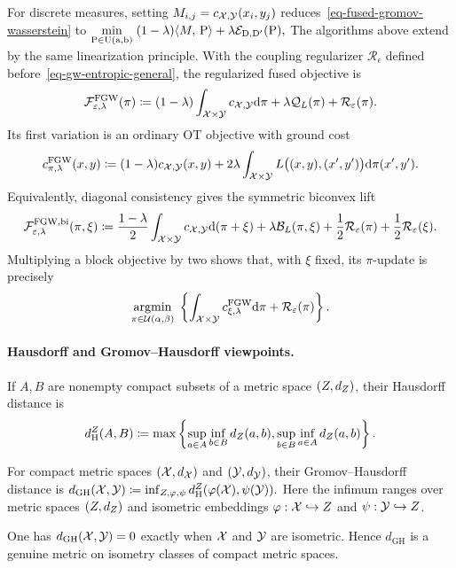 For discrete measures, setting $M_{i,j}=c_{\mathcal{X},\mathcal{Y}}(x_i,y_j)$ reduces~\eqref{eq-fused-gromov-wasserstein} to
\(\underset{\mathrm{P}\in\mathrm{U}(\mathrm{a},\mathrm{b})}{\min}\; (1-\lambda)\langle M,\,\mathrm{P}\rangle + \lambda\mathcal{E}_{\mathrm{D},\mathrm{D}'}(\mathrm{P}),\)
The algorithms above extend by the same linearization principle. With the coupling regularizer $\mathcal R_\epsilon$ defined before~\eqref{eq-gw-entropic-general}, the regularized fused objective is
\[
\mathcal F_{\varepsilon,\lambda}^{\mathrm{FGW}}(\pi)
\coloneqq
(1-\lambda)\int_{\mathcal{X}\times\mathcal{Y}}c_{\mathcal{X},\mathcal{Y}}\mathrm{d}\pi
+
\lambda\mathcal Q_L(\pi)
+
\mathcal R_\varepsilon(\pi).
\]
Its first variation is an ordinary OT objective with ground cost
\begin{equation}\label{eq-fused-gw-linearized-cost}
c_{\pi,\lambda}^{\mathrm{FGW}}(x,y)
\coloneqq
(1-\lambda)c_{\mathcal{X},\mathcal{Y}}(x,y)
+
2\lambda
\int_{\mathcal{X}\times\mathcal{Y}}
L\bigl((x,y),(x',y')\bigr)\mathrm{d}\pi(x',y').
\end{equation}
Equivalently, diagonal consistency gives the symmetric biconvex lift
\[
\mathcal F_{\varepsilon,\lambda}^{\mathrm{FGW,bi}}(\pi,\xi)
\coloneqq
\frac{1-\lambda}{2}
\int_{\mathcal{X}\times\mathcal{Y}}c_{\mathcal{X},\mathcal{Y}}\mathrm{d}(\pi+\xi)
+
\lambda\mathcal B_L(\pi,\xi)
+
\frac12\mathcal R_\varepsilon(\pi)
+
\frac12\mathcal R_\varepsilon(\xi).
\]
Multiplying a block objective by two shows that, with $\xi$ fixed, its $\pi$-update is precisely
\[
\underset{\pi\in\mathcal{U}(\alpha,\beta)}{\operatorname{argmin}}\;
\left\{
\int_{\mathcal{X}\times\mathcal{Y}}c_{\xi,\lambda}^{\mathrm{FGW}}\mathrm{d}\pi
+
\mathcal R_\varepsilon(\pi)
\right\}.
\]
\paragraph{Hausdorff and Gromov--Hausdorff viewpoints.}
\begin{defn}\label{def-hausdorff-distance}
If $A,B$ are nonempty compact subsets of a metric space $(Z,d_Z)$, their Hausdorff distance is
\[
d_{\mathrm H}^{Z}(A,B)
\coloneqq
\max\left\{
\sup_{a\in A}\inf_{b\in B}d_Z(a,b),
\sup_{b\in B}\inf_{a\in A}d_Z(a,b)
\right\}.
\]
\end{defn}
\begin{defn}\label{def-gromov-hausdorff-distance}
For compact metric spaces $(\mathcal{X},d_{\mathcal{X}})$ and $(\mathcal{Y},d_{\mathcal{Y}})$, their Gromov--Hausdorff distance is \(d_{\mathrm{GH}}(\mathcal{X},\mathcal{Y}) \coloneqq \inf_{Z,\varphi,\psi} d_{\mathrm H}^{Z}(\varphi(\mathcal{X}),\psi(\mathcal{Y})).\)
Here the infimum ranges over metric spaces $(Z,d_Z)$ and isometric embeddings $\varphi:\mathcal{X}\hookrightarrow Z$ and $\psi:\mathcal{Y}\hookrightarrow Z$.
\end{defn}
One has $d_{\mathrm{GH}}(\mathcal{X},\mathcal{Y})=0$ exactly when $\mathcal{X}$ and $\mathcal{Y}$ are isometric. Hence $d_{\mathrm{GH}}$ is a genuine metric on isometry classes of compact metric spaces.

